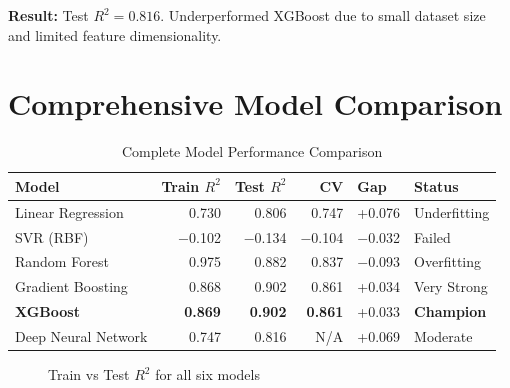 \documentclass[12pt,a4paper]{report}
\begin{document}
\textbf{Result:} Test $R^2 = 0.816$. Underperformed XGBoost due to small dataset size and limited feature dimensionality.

\section{Comprehensive Model Comparison}

\begin{table}[H]
\centering
\caption{Complete Model Performance Comparison}
\begin{tabular}{lrrrll}
\toprule
\textbf{Model} & \textbf{Train $R^2$} & \textbf{Test $R^2$} & \textbf{CV} & \textbf{Gap} & \textbf{Status} \\
\midrule
Linear Regression   & 0.730    & 0.806    & 0.747    & +0.076   & \textcolor{warnyellow}{Underfitting} \\
SVR (RBF)           & $-$0.102 & $-$0.134 & $-$0.104 & $-$0.032 & \textcolor{failred}{Failed} \\
Random Forest       & 0.975    & 0.882    & 0.837    & $-$0.093 & \textcolor{warnyellow}{Overfitting} \\
Gradient Boosting   & 0.868    & 0.902    & 0.861    & +0.034   & \textcolor{successgreen}{Very Strong} \\
\textbf{XGBoost}    & \textbf{0.869} & \textbf{0.902} & \textbf{0.861} & +0.033 & \textcolor{successgreen}{\textbf{Champion}} \\
Deep Neural Network & 0.747    & 0.816    & N/A      & +0.069   & \textcolor{warnyellow}{Moderate} \\
\bottomrule
\end{tabular}
\end{table}

\begin{figure}[H]
\centering
{}
\caption{Train vs Test $R^2$ for all six models}
\end{figure}
\end{document}
